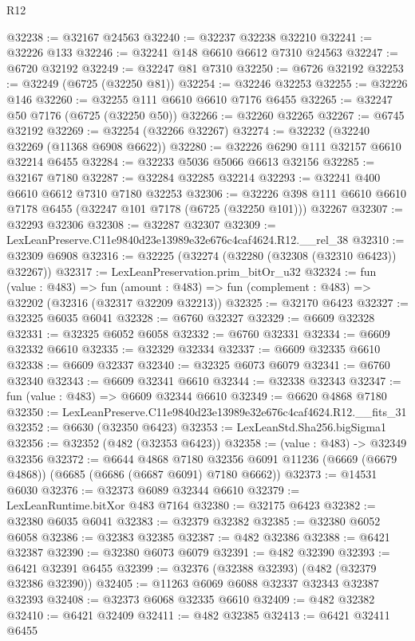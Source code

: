 \begin{lexlean}{R12}
\begin{coremodule}
@32238 := @32167 @24563
@32240 := @32237 @32238 @32210
@32241 := @32226 @133
@32246 := @32241 @148 @6610 @6612 @7310 @24563
@32247 := @6720 @32192
@32249 := @32247 @81 @7310
@32250 := @6726 @32192
@32253 := @32249 (@6725 (@32250 @81))
@32254 := @32246 @32253
@32255 := @32226 @146
@32260 := @32255 @111 @6610 @6610 @7176 @6455
@32265 := @32247 @50 @7176 (@6725 (@32250 @50))
@32266 := @32260 @32265
@32267 := @6745 @32192
@32269 := @32254 (@32266 @32267)
@32274 := @32232 (@32240 @32269 (@11368 @6908 @6622))
@32280 := @32226 @6290 @111 @32157 @6610 @32214 @6455
@32284 := @32233 @5036 @5066 @6613 @32156
@32285 := @32167 @7180
@32287 := @32284 @32285 @32214
@32293 := @32241 @400 @6610 @6612 @7310 @7180 @32253
@32306 := @32226 @398 @111 @6610 @6610 @7178 @6455 (@32247 @101 @7178 (@6725 (@32250 @101))) @32267
@32307 := @32293 @32306
@32308 := @32287 @32307
@32309 := LexLeanPreserve.C11e9840d23e13989e32e676c4caf4624.R12.__rel_38
@32310 := @32309 @6908
@32316 := @32225 (@32274 (@32280 (@32308 (@32310 @6423)) @32267))
@32317 := LexLeanPreservation.prim_bitOr_u32
@32324 := fun (value : @483) =>
  fun (amount : @483) => fun (complement : @483) => @32202 (@32316 (@32317 @32209 @32213))
@32325 := @32170 @6423
@32327 := @32325 @6035 @6041
@32328 := @6760 @32327
@32329 := @6609 @32328
@32331 := @32325 @6052 @6058
@32332 := @6760 @32331
@32334 := @6609 @32332 @6610
@32335 := @32329 @32334
@32337 := @6609 @32335 @6610
@32338 := @6609 @32337
@32340 := @32325 @6073 @6079
@32341 := @6760 @32340
@32343 := @6609 @32341 @6610
@32344 := @32338 @32343
@32347 := fun (value : @483) => @6609 @32344 @6610
@32349 := @6620 @4868 @7180
@32350 := LexLeanPreserve.C11e9840d23e13989e32e676c4caf4624.R12.__fits_31
@32352 := @6630 (@32350 @6423)
@32353 := LexLeanStd.Sha256.bigSigma1
@32356 := @32352 (@482 (@32353 @6423))
@32358 := (value : @483) -> @32349 @32356
@32372 := @6644
    @4868
    @7180
    @32356
    @6091
    @11236
    (@6669 (@6679 @4868))
    (@6685 (@6686 (@6687 @6091) @7180 @6662))
@32373 := @14531 @6030
@32376 := @32373 @6089 @32344 @6610
@32379 := LexLeanRuntime.bitXor @483 @7164
@32380 := @32175 @6423
@32382 := @32380 @6035 @6041
@32383 := @32379 @32382
@32385 := @32380 @6052 @6058
@32386 := @32383 @32385
@32387 := @482 @32386
@32388 := @6421 @32387
@32390 := @32380 @6073 @6079
@32391 := @482 @32390
@32393 := @6421 @32391 @6455
@32399 := @32376 (@32388 @32393) (@482 (@32379 @32386 @32390))
@32405 := @11263 @6069 @6088 @32337 @32343 @32387 @32393
@32408 := @32373 @6068 @32335 @6610
@32409 := @482 @32382
@32410 := @6421 @32409
@32411 := @482 @32385
@32413 := @6421 @32411 @6455

\end{coremodule}
\end{lexlean}
